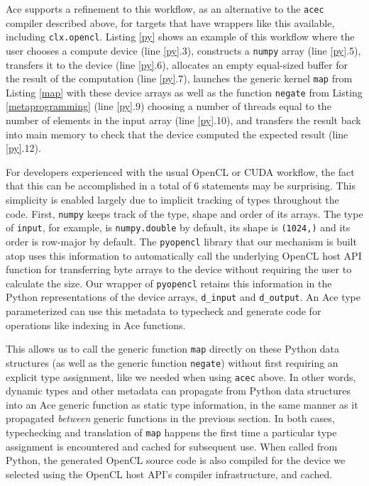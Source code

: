 \documentclass[9pt,preprint]{sigplanconf}
\begin{document}
Ace supports a refinement to this workflow, as an alternative to the \verb|acec| compiler described above, for targets that have wrappers like this available, including \verb|clx.opencl|. Listing \ref{py} shows an example of this workflow where the user chooses a compute device (line \ref{py}.3),  constructs a \verb|numpy| array (line \ref{py}.5), transfers it to the device (line \ref{py}.6), allocates an empty equal-sized buffer for the result of the computation (line \ref{py}.7), launches the {generic} kernel \verb|map| from Listing \ref{map} with these device arrays as well as the function \verb|negate| from Listing \ref{metaprogramming} (line \ref{py}.9) choosing a number of threads equal to the number of elements in the input array (line \ref{py}.10), and transfers the result back into main memory to check that the device computed the expected result (line \ref{py}.12).

For developers experienced with the usual OpenCL or CUDA workflow, the fact that this can be accomplished in a total of 6 statements may be surprising. This simplicity is enabled largely due to  implicit tracking of types throughout the code. First, \verb|numpy| keeps track of the type, shape and order of its arrays. The type of \verb|input|, for example, is \verb|numpy.double| by default, its shape is \verb|(1024,)| and its order is row-major by default. The \verb|pyopencl| library that our mechanism is built atop uses this information to automatically call the underlying OpenCL host API function for transferring byte arrays to the device without requiring the user to calculate the size. Our wrapper of \verb|pyopencl| retains this information in the Python representations of the device arrays, \verb|d_input| and \verb|d_output|. An Ace type parameterized can use this metadata to typecheck and generate code for operations like indexing in Ace functions.

This allows us to call the generic function \verb|map| directly on these Python data structures (as well as the generic function \verb|negate|) without first requiring an explicit type assignment, like we needed when using \verb|acec| above. In other words, dynamic types and other metadata can propagate from Python data structures into an Ace generic function as static type information, in the same manner as it propagated \emph{between} generic functions in the previous section. In both cases, typechecking and translation of \verb|map| happens the first time a particular type assignment is encountered and cached for subsequent use. When called from Python, the generated OpenCL source code is also compiled for the device we selected using the OpenCL host API's compiler infrastructure, and cached. 
\end{document}
